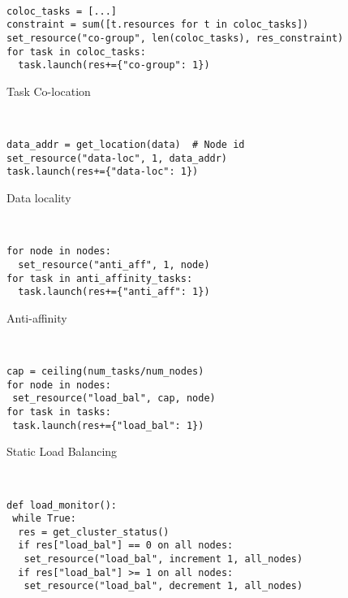 \begin{figure*}[ht]
~
~
\begin{subfigure}{.24\textwidth}
  \centering
  \begin{verbatim}
coloc_tasks = [...]
constraint = sum([t.resources for t in coloc_tasks])
set_resource("co-group", len(coloc_tasks), res_constraint)
for task in coloc_tasks:
  task.launch(res+={"co-group": 1})
  \end{verbatim}
  \caption{Task Co-location}
  \label{fig:policycode:taskcoloc}
\end{subfigure}
~
~
\begin{subfigure}{.24\textwidth}
  \centering
  \begin{verbatim}
data_addr = get_location(data)  # Node id
set_resource("data-loc", 1, data_addr)
task.launch(res+={"data-loc": 1})
  \end{verbatim}
  \caption{Data locality}
  \label{fig:policycode:datalocality}
\end{subfigure}
~
~
\begin{subfigure}{.24\textwidth}
  \centering
  \begin{verbatim}
for node in nodes:
  set_resource("anti_aff", 1, node)
for task in anti_affinity_tasks:
  task.launch(res+={"anti_aff": 1})
  \end{verbatim}
  \caption{Anti-affinity}
  \label{fig:policycode:antiaff}
\end{subfigure}
~
~
\begin{subfigure}{.24\textwidth}
  \centering
  \begin{verbatim}
cap = ceiling(num_tasks/num_nodes)
for node in nodes:
 set_resource("load_bal", cap, node)
for task in tasks:
 task.launch(res+={"load_bal": 1})
  \end{verbatim}
  \caption{Static Load Balancing}
  \label{fig:policycode:staticloadbal}
\end{subfigure}

\newline
\vspace{2.0mm}

~
~
\begin{subfigure}{.24\textwidth}
  \centering
  \begin{verbatim}
def load_monitor():
 while True:
  res = get_cluster_status()
  if res["load_bal"] == 0 on all nodes:
   set_resource("load_bal", increment 1, all_nodes)
  if res["load_bal"] >= 1 on all nodes:
   set_resource("load_bal", decrement 1, all_nodes)


\end{verbatim}
\end{subfigure}
\end{figure*}
